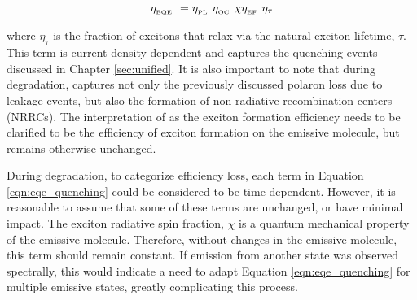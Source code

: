 \documentclass[../thesis.tex]{subfiles}
\begin{document}
\begin{equation}
\eta_{_\text{\tiny EQE}}\ =\eta_{_\text{\tiny PL}}\ \eta_{_\text{\tiny OC}}\ \chi\eta_{_\text{\tiny EF}}\ \eta_\tau
\label{eqn:eqe_quenching}
\end{equation}

where $\eta_\tau$ is the fraction of excitons that relax via the natural exciton lifetime, $\tau$.  
This term is current-density dependent and captures the quenching events discussed in Chapter \ref{sec:unified}.
It is also important to note that during degradation, \ef captures not only the previously discussed polaron loss due to leakage events, but also the formation of non-radiative recombination centers (NRRCs).\supercite{Kondakov2003,Kondakov2007d}
The interpretation of \ef as the exciton formation efficiency needs to be clarified to be the efficiency of exciton formation on the emissive molecule, but remains otherwise unchanged.

During degradation, to categorize efficiency loss, each term in Equation \ref{eqn:eqe_quenching} could be considered to be time dependent.  
However, it is reasonable to assume that some of these terms are unchanged, or have minimal impact.
The exciton radiative spin fraction, $\chi$ is a quantum mechanical property of the emissive molecule.
Therefore, without changes in the emissive molecule, this term should remain constant.  
If emission from another state was observed spectrally, this would indicate a need to adapt Equation \ref{eqn:eqe_quenching} for multiple emissive states, greatly complicating this process.


%
\end{document}
